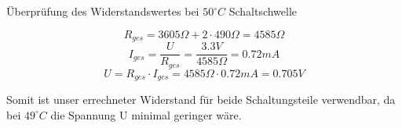 
Überprüfung des Widerstandswertes bei $50^{\circ} C$ Schaltschwelle

\[ R_{ges} = 3605 \Omega + 2 \cdot 490 \Omega = 4585 \Omega \]
\[ I_{ges} = \frac{U}{R_{ges}} = \frac{3.3 V}{4585 \Omega} = 0.72 mA \]
\[ U = R_{ges} \cdot I_{ges} = 4585 \Omega \cdot 0.72 mA = 0.705 V \]

Somit ist unser errechneter Widerstand für beide Schaltungsteile verwendbar, da bei $49^{\circ} C$ die Spannung U minimal geringer wäre.